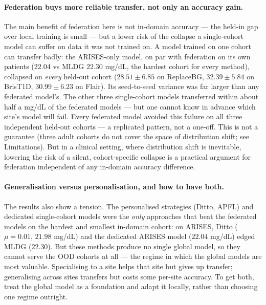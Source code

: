 \documentclass[10pt,letterpaper]{article}
\begin{document}
\paragraph{Federation buys more reliable transfer, not only an accuracy gain.}
The main benefit of federation here is not in-domain accuracy --- the held-in
gap over local training is small --- but a lower risk of the collapse a
single-cohort model can suffer on data it was not trained on. A model trained
on one cohort can transfer badly: the ARISES-only model, on par with
federation on its own patients ($22.04$ vs MLDG $22.30$ mg/dL, the hardest
cohort for every method), collapsed on \emph{every} held-out cohort ($28.51
\pm 6.85$ on ReplaceBG, $32.39 \pm 5.84$ on BrisT1D, $30.99 \pm 6.23$ on
Flair). Its seed-to-seed variance was far larger than any federated model's.
The other three single-cohort models transferred within about half a mg/dL of
the federated models --- but one cannot know in advance which site's model
will fail. Every federated model avoided this failure on all three
independent held-out cohorts --- a replicated pattern, not a one-off. This is
not a guarantee (three adult cohorts do not cover the space of distribution
shift; see Limitations). But in a clinical setting, where distribution shift
is inevitable, lowering the risk of a silent, cohort-specific collapse is a
practical argument for federation independent of any in-domain accuracy
difference.

\paragraph{Generalisation versus personalisation, and how to have both.} The
results also show a tension. The personalised strategies (Ditto, APFL) and
dedicated single-cohort models were the \emph{only} approaches that beat the
federated models on the hardest and smallest in-domain cohort: on ARISES,
Ditto ($\mu{=}0.01$, $21.98$ mg/dL) and the dedicated ARISES model ($22.04$
mg/dL) edged MLDG ($22.30$). But these methods produce no single global model,
so they cannot serve the OOD cohorts at all --- the regime in which the global
models are most valuable. Specialising to a site helps that site but gives up
transfer; generalising across sites transfers but costs some per-site
accuracy. To get both, treat the global model as a foundation and adapt it
locally, rather than choosing one regime outright.
\end{document}
